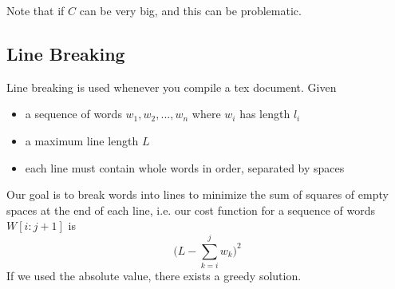   Note that if $C$ can be very big, and this can be problematic. 

\subsection{Line Breaking}

  \begin{definition}
    Line breaking is used whenever you compile a tex document. Given 
    \begin{itemize}
      \item a sequence of words $w_1, w_2, ..., w_n$ where $w_i$ has length $l_i$
      \item a maximum line length $L$
      \item each line must contain whole words in order, separated by spaces
    \end{itemize}
    Our goal is to break words into lines to minimize the sum of squares of empty spaces at the end of each line, i.e. our cost function for a sequence of words $W[i:j+1]$ is 
    \begin{equation}
      \bigg( L - \sum_{k=i}^j w_k \bigg)^2
    \end{equation} 
    If we used the absolute value, there exists a greedy solution. 
  \end{definition}

